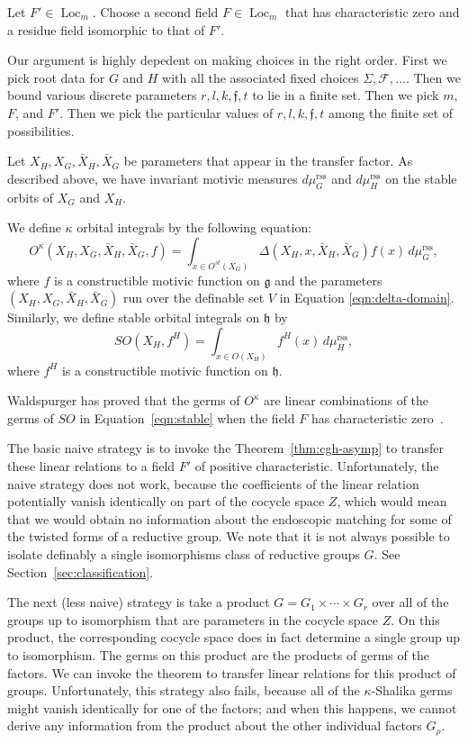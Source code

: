 \documentclass[12pt]{amsart}
\newcommand{\op}[1]{\operatorname{#1}}
\def\s{{\mathfrak{f}}}
\newcommand{\cF}{\mathcal{F}}
\newcommand{\fg}{\mathfrak{g}}
\newcommand{\fh}{\mathfrak{h}}
\newcommand{\reg}{\mathrm{rss}}
\theoremstyle{plain}
\theoremstyle{definition}
\begin{document}
Let $F'\in\op{Loc}_m$.  Choose a second field $F\in \op{Loc}_m$ that
has characteristic zero and a residue field isomorphic to that of
$F'$.

Our argument is highly depedent on making choices in the right
order.  First we pick root data for $G$ and $H$ with all the
associated fixed choices $\Sigma,\cF,\ldots$.  Then we bound various
discrete parameters 
$r,l,k,\s,t$ to lie in a finite set.  Then we pick $m$, $F$, and $F'$.
Then we pick the particular values of $r,l,k,\s,t$ among the finite
set of possibilities.

Let $X_H,X_G,\bar X_H,\bar X_G$ be parameters that appear in the
transfer factor.  As described above, we have invariant motivic 
measures $d\mu^\reg_G$
and $d\mu^\reg_H$ on the stable orbits of $X_G$ and $X_H$.

We define $\kappa$ orbital integrals by the following equation:
\begin{equation}\label{eqn:kappa}
O^\kappa(X_H,X_G,\bar X_H,\bar X_G,f) = \int_{x\in O^{st}(X_G)}
\Delta(X_H,x,\bar X_H,\bar X_G) f (x)\,d\mu^\reg_G,
\end{equation}
where $f$ is a constructible motivic function on $\fg$ and the
parameters $(X_H,X_G,\bar X_H,\bar X_G)$ run over the definable set
$V$ in Equation \ref{eqn:delta-domain}.  Similarly, we define stable
orbital integrals on $\fh$ by
\begin{equation}\label{eqn:stable}
SO(X_H,f^H) = \int_{x\in O(X_H)} f^H (x)\,d\mu^\reg_H,
\end{equation}
where $f^H$ is a constructible motivic function on $\fh$.


Waldspurger has proved that the germs of $O^\kappa$ are linear
combinations of the germs of $SO$ in Equation~\ref{eqn:stable} when
the field $F$ has characteristic zero~\cite{W}.

The basic naive strategy is to invoke the Theorem~\ref{thm:cgh-asymp} to transfer these
linear relations to a field $F'$ of positive characteristic.
Unfortunately, the naive strategy does not work, because the
coefficients of the linear relation potentially vanish identically
on part of the cocycle space $Z$, which would mean that we would
obtain no information about the endoscopic matching for some of the
twisted forms of a reductive group.  We note that it is not always
possible to isolate definably a single isomorphisms class of reductive
groups $G$.  See Section~\ref{sec:classification}.

The next (less naive) strategy is take a product $G =
G_1\times\cdots\times G_r$ over all of the groups up to isomorphism
that are parameters in the cocycle space $Z$.  On this product, the
corresponding cocycle space does in fact determine a single group up
to isomorphism.  The germs on this product are the products of germs
of the factors.  We can invoke the theorem to transfer linear
relations for this product of groups.  Unfortunately, this strategy
also fails, because all of the $\kappa$-Shalika germs might vanish
identically for one of the factors; and when this happens, we cannot
derive any information from the product about the other individual factors
$G_\rho$.
\end{document}
